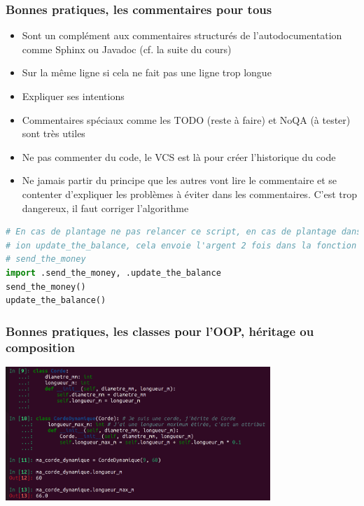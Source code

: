 \documentclass{beamer}
\begin{document}
    \begin{frame}[fragile]
        \transdissolve
        \frametitle{Bonnes pratiques, les commentaires pour tous}


        \begin{itemize}

            \item Sont un complément aux commentaires structurés de l'autodocumentation comme Sphinx ou Javadoc (cf. la suite du cours)
            \item Sur la même ligne si cela ne fait pas une ligne trop longue
            \item Expliquer ses intentions
            \item Commentaires spéciaux comme les TODO (reste à faire) et NoQA (à tester) sont très utiles
            \item Ne pas commenter du code, le VCS est là pour créer l'historique du code
            \item Ne jamais partir du principe que les autres vont lire le commentaire et se contenter d'expliquer les problèmes à éviter dans les commentaires.
            C'est trop dangereux, il faut corriger l'algorithme

        \end{itemize}
        \begin{lstlisting}[language=python]
# En cas de plantage ne pas relancer ce script, en cas de plantage dans la fonct
# ion update_the_balance, cela envoie l'argent 2 fois dans la fonction
# send_the_money
import .send_the_money, .update_the_balance
send_the_money()
update_the_balance()
        \end{lstlisting}
    \end{frame}

    \begin{frame}
        \transdissolve
        \frametitle{Bonnes pratiques, les classes pour l'OOP, héritage ou composition}

        \centering
        \includegraphics[width=10cm]{image/inheritance-or-composition.png}

    \end{frame}
\end{document}
